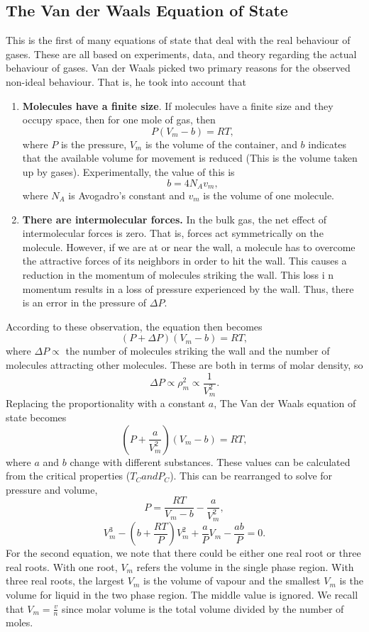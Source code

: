 \documentclass[11pt]{article}
\theoremstyle{plain} %
\theoremstyle{definition}
\theoremstyle{example}
\theoremstyle{remark}
\begin{document}
\subsection{The Van der Waals Equation of State}
	
This is the first of many equations of state that deal with the real behaviour of gases. These are all based on experiments, data, and theory regarding the actual behaviour of gases. Van der Waals picked two primary reasons for the observed non-ideal behaviour. That is, he took into account that 
\begin{enumerate}
	\item \textbf{Molecules have a finite size}. If molecules have a finite size and they occupy space, then for one mole of gas, then
	$$P(V_m-b) = RT,$$
	where $P$ is the pressure, $V_m$ is the volume of the container, and $b$ indicates that the available volume for movement is reduced (This is the volume taken up by gases). Experimentally, the value of this is 
	$$b = 4N_Av_m,$$
	where $N_A$ is Avogadro's constant and $v_m$ is the volume of one molecule. 
	\item \textbf{There are intermolecular forces.} In the bulk gas, the net effect of intermolecular forces is zero. That is, forces act symmetrically on the molecule. However, if we are at or near the wall, a molecule has to overcome the attractive forces of its neighbors in order to hit the wall. This causes a reduction in the momentum of molecules striking the wall. This loss i n momentum results in a loss of pressure experienced by the wall. Thus, there is an error in the pressure of $\Delta P$. 
\end{enumerate}
According to these observation, the equation then becomes
$$(P + \Delta P)(V_m-b) = RT,$$
where $\Delta P \propto$ the number of molecules striking the wall and the number of molecules attracting other molecules. These are both in terms of molar density, so 
$$\Delta P \propto \rho_m^2 \propto \frac{1}{V_m^2}.$$
Replacing the proportionality with a constant $a$, The Van der Waals equation of state becomes
$$\left(P+\frac{a}{V_m^2}\right)(V_m-b) = RT,$$
where $a$ and $b$ change with different substances. These values can be calculated from the critical properties ($T_C and P_C$). This can be rearranged to solve for pressure and volume, 
$$P = \frac{RT}{V_m-b}-\frac{a}{V_m^2},$$
$$V_m^3-\left(b+\frac{RT}{P}\right)V_m^2+\frac{a}{P}V_m-\frac{ab}{P} = 0.$$
For the second equation, we note that there could be either one real root or three real roots. With one root, $V_m$ refers the volume in the single phase region. With three real roots, the largest $V_m$ is the volume of vapour and the smallest $V_m$ is the volume for liquid in the two phase region. The middle value is ignored. We recall that $V_m = \frac{v}{n}$ since molar volume is the total volume divided by the number of moles. 
	
\end{document}
